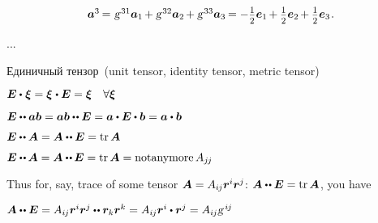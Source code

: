 \begin{otherlanguage}{russian}
\begin{tcolorbox}
\[\begin{array}{l}
%
\bm{a}^3 \hspace{-0.2ex}=\hspace{.1ex} \textsl{g}^{\hspace{.2ex}31} \bm{a}_1 \hspace{-0.2ex} + \textsl{g}^{\hspace{.2ex}32} \bm{a}_2 \hspace{-0.2ex} + \textsl{g}^{\hspace{.2ex}33} \bm{a}_3 \hspace{-0.2ex} = - \smalldisplaystyleonehalf \bm{e}_1 \hspace{-0.2ex} + \smalldisplaystyleonehalf \bm{e}_2 \hspace{-0.2ex} + \smalldisplaystyleonehalf \bm{e}_3 \hspace{.16ex}.
\end{array}\]

\par\end{tcolorbox}

...


Единичный тензор~(unit tensor, identity tensor,  metric tensor)

$\bm{E} \dotp \hspace{0.1ex} \bm{\xi} = \bm{\xi} \hspace{0.1ex} \dotp \bm{E} = \bm{\xi} \quad \forall \bm{\xi}$

$\bm{E} \dotdotp \bm{a} \bm{b} = \bm{a} \bm{b} \dotdotp \bm{E} = \bm{a} \dotp \bm{E} \dotp \bm{b} = \bm{a} \dotp \bm{b}$

$\bm{E} \dotdotp \bm{A} = \bm{A} \dotdotp \bm{E} = \operatorname{tr} \bm{A}$


$\bm{E} \dotdotp \hspace{-0.1ex} \bm{A} = \bm{A} \dotdotp \hspace{-0.1ex} \bm{E} = \operatorname{tr} \bm{A} = \operatorname{not anymore} A_{j\hspace{-0.12ex}j}$

Thus for, say, trace of some tensor ${\bm{A} = A_{i\hspace{-0.1ex}j} \bm{r}^i \bm{r}^j}$: $\bm{A} \dotdotp \bm{E} = \operatorname{tr} \bm{A}$, you have

$\bm{A} \dotdotp \bm{E} = A_{i\hspace{-0.1ex}j} \bm{r}^i \bm{r}^j \dotdotp \bm{r}_k \bm{r}^k = A_{i\hspace{-0.1ex}j} \bm{r}^i \dotp \bm{r}^j = A_{i\hspace{-0.1ex}j} \textsl{g}^{\hspace{.32ex}i\hspace{-0.1ex}j}$



\end{otherlanguage}
